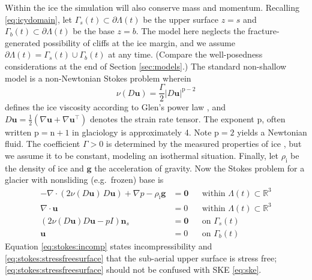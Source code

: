 \documentclass[hidelinks,onefignum,onetabnum,final]{siamart220329}  %
\newcommand{\RR}{\mathbb{R}}
\newcommand{\grad}{\nabla}
\newcommand{\bg}{\mathbf{g}}
\newcommand{\bn}{\mathbf{n}}
\newcommand{\bu}{\mathbf{u}}
\newcommand{\bzero}{\bm{0}}
\newcommand{\nn}{{\text{n}}}
\newcommand{\pp}{{\text{p}}}
\newcommand{\rhoi}{\rho_{\text{i}}}
\begin{document}
Within the ice the simulation will also conserve mass and momentum.  Recalling \eqref{eq:icydomain}, let $\Gamma_s(t) \subset \partial \Lambda(t)$ be the upper surface $z=s$ and
$\Gamma_b(t) \subset \partial \Lambda(t)$ be the base $z=b$.  The model here neglects the fracture-generated possibility of cliffs at the ice margin, and we assume $\partial \Lambda(t) = \Gamma_s(t) \cup \Gamma_b(t)$ at any time.  (Compare the well-posedness considerations at the end of Section \ref{sec:models}.)  The standard non-shallow model is a non-Newtonian Stokes problem \cite{GreveBlatter2009,JouvetRappaz2011,SchoofHewitt2013} wherein
\begin{equation}
\nu(D\bu) = \frac{\Gamma}{2} |D\bu|^{\pp-2} \label{eq:glen}
\end{equation}
defines the ice viscosity according to Glen's power law \cite{GreveBlatter2009}, and $D\bu=\frac{1}{2}(\grad \bu + \grad \bu^{\top})$ denotes the strain rate tensor.  The exponent $\pp$, often written $\pp=\nn+1$ in glaciology \cite{GoldsbyKohlstedt2001} is approximately 4.  Note $\pp=2$ yields a Newtonian fluid.  The coefficient $\Gamma>0$ is determined by the measured properties of ice \cite{GoldsbyKohlstedt2001,GreveBlatter2009}, but we assume it to be constant, modeling an isothermal situation.  Finally, let $\rhoi$ be the density of ice and $\bg$ the acceleration of gravity.  Now the Stokes problem for a glacier with nonsliding (e.g.~frozen) base \cite{JouvetRappaz2011} is
\begin{subequations}
\label{eq:stokes}
\begin{align}
- \nabla \cdot \left(2 \nu(D\bu)\, D\bu\right) + \nabla p - \rhoi \bg &= \bzero && \text{within $\Lambda(t) \subset \RR^3$} \\
\nabla \cdot \bu &= 0 && \text{within $\Lambda(t) \subset \RR^3$} \label{eq:stokes:incomp} \\
\left(2 \nu(D\bu) D\bu - pI\right) \bn_s &= \bzero && \text{on $\Gamma_s(t)$}\label{eq:stokes:stressfreesurface} \\
\bu  &= 0 && \text{on $\Gamma_b(t)$}
\end{align}
\end{subequations}
Equation \eqref{eq:stokes:incomp} states incompressibility and \eqref{eq:stokes:stressfreesurface} that the sub-aerial upper surface is stress free; \eqref{eq:stokes:stressfreesurface} should not be confused with SKE \eqref{eq:ske}.
\end{document}
